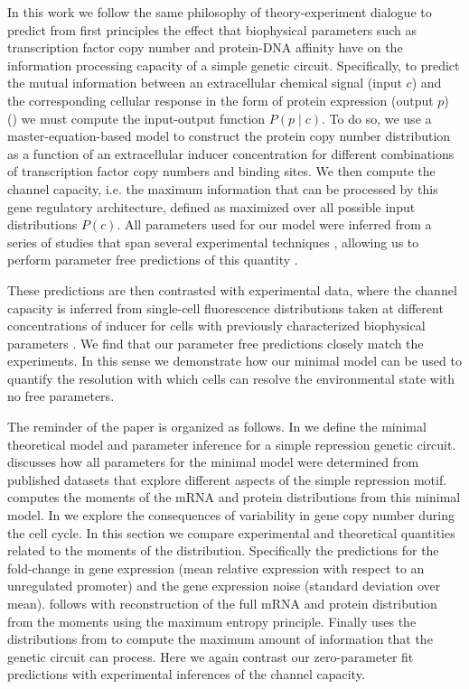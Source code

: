In this work we follow the same philosophy of theory-experiment dialogue to
predict from first principles the effect that biophysical parameters such as
transcription factor copy number and protein-DNA affinity have on the
information processing capacity of a simple genetic circuit. Specifically, to
predict the mutual information between an extracellular chemical signal (input
$c$) and the corresponding cellular response in the form of protein expression
(output $p$) () we must compute the input-output function
$P(p \mid c)$. To do so, we use a master-equation-based model to construct the
protein copy number distribution as a function of an extracellular inducer
concentration for different combinations of transcription factor copy numbers
and binding sites. We then compute the channel capacity, i.e. the maximum
information that can be processed by this gene regulatory architecture, defined
as  maximized over all possible input distributions $P(c)$.
All parameters used for our model were inferred from a series of studies that
span several experimental techniques \cite{Garcia2011c, Jones2014a,
Brewster2014, Razo-Mejia2018}, allowing us to perform parameter free predictions
of this quantity \cite{Phillips2019}.

These predictions are then contrasted with experimental data, where the channel
capacity is inferred from single-cell fluorescence distributions taken at
different concentrations of inducer for cells with previously characterized
biophysical parameters \cite{Garcia2011c, Razo-Mejia2018}. We find that our
parameter free predictions closely match the experiments. In this sense we
demonstrate how our minimal model can be used to quantify the resolution with
which cells can resolve the environmental state with no free parameters.

The reminder of the paper is organized as follows. In  we
define the minimal theoretical model and parameter inference for a simple
repression genetic circuit.  discusses how all parameters for
the minimal model were determined from published datasets that explore different
aspects of the simple repression motif.  computes the
moments of the mRNA and protein distributions from this minimal model. In
 we explore the consequences of variability in gene copy
number during the cell cycle. In this section we compare experimental and
theoretical quantities related to the moments of the distribution. Specifically
the predictions for the fold-change in gene expression (mean relative expression
with respect to an unregulated promoter) and the gene expression noise (standard
deviation over mean).  follows with reconstruction of the
full mRNA and protein distribution from the moments using the maximum entropy
principle. Finally  uses the distributions from
 to compute the maximum amount of information that the
genetic circuit can process. Here we again contrast our zero-parameter fit
predictions with experimental inferences of the channel capacity.


